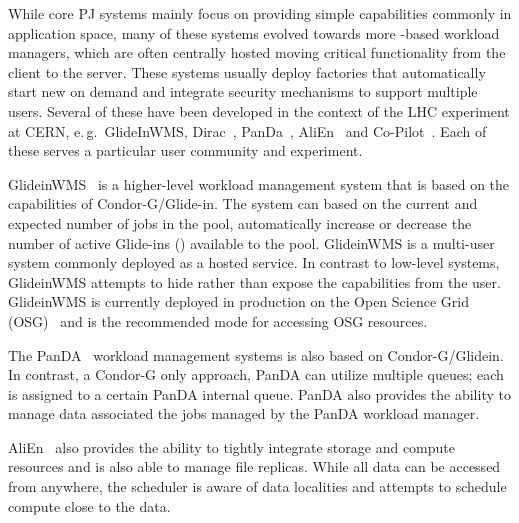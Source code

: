 \documentclass{sig-alternate}
\begin{document}
 

While core PJ systems mainly focus on providing simple \pilot capabilities
commonly in application space, many of these systems evolved towards more
\pilot-based workload managers, which are often centrally hosted moving
critical functionality from the client to the server. These systems usually
deploy \pilot factories that automatically start new \pilots on demand and
integrate security mechanisms to support multiple users. Several of these have
been developed in the context of the LHC experiment at CERN, e.\,g.\
GlideInWMS, Dirac~\cite{1742-6596-219-6-062049},
PanDa~\cite{1742-6596-331-7-072069}, AliEn~\cite{1742-6596-119-6-062012} and
Co-Pilot~\cite{copilot-tr}. Each of these \pilots serves a particular user
community and experiment.

GlideinWMS~\cite{1742-6596-119-6-062044} is a higher-level workload management
system that is based on the \pilot capabilities of Condor-G/Glide-in. The
system can based on the current and expected number of jobs in the pool,
automatically increase or decrease the number of active Glide-ins (\pilots)
available to the pool. GlideinWMS is a multi-user \pilotjob system commonly
deployed as a hosted service. In contrast to low-level \pilotjob systems,
GlideinWMS attempts to hide rather than expose the \pilot capabilities from
the user. GlideinWMS is currently deployed in production on the Open Science
Grid (OSG)~\cite{url_osg} and is the recommended mode for accessing OSG resources.

The PanDA~\cite{1742-6596-331-7-072069} workload management systems is also
based on Condor-G/Glidein. In contrast, a Condor-G only approach,
PanDA can utilize multiple queues; each \pilot is assigned to a certain PanDA
internal queue. PanDA also provides the ability to manage data associated the
jobs managed by the PanDA workload manager.

AliEn~\cite{1742-6596-119-6-062012} also provides the ability to tightly
integrate storage and compute resources and is also able to manage file
replicas. While all data can be accessed from anywhere, the scheduler is aware
of data localities and attempts to schedule compute close to the data.
\end{document}
